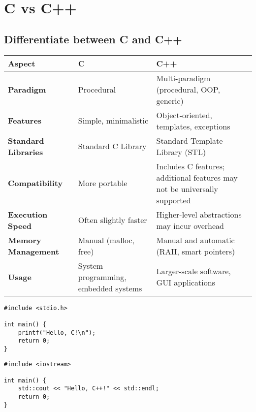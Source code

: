 \section{C vs C++}

\subsection{Differentiate between C and C++}
\begin{tabularx}{\textwidth}{|p{3.5cm}|X|X|}
    \hline \rowcolor{tableheader}
    \textbf{Aspect}                    & \textbf{C}                           & \textbf{C++} \\
    \hline \textbf{Paradigm}           & Procedural                           & Multi-paradigm (procedural, OOP, generic) \\
    \hline \textbf{Features}           & Simple, minimalistic                 & Object-oriented, templates, exceptions \\
    \hline \textbf{Standard Libraries} & Standard C Library                   & Standard Template Library (STL) \\
    \hline \textbf{Compatibility}      & More portable                        & Includes C features; additional features may not be universally supported \\
    \hline \textbf{Execution Speed}    & Often slightly faster                & Higher-level abstractions may incur overhead \\
    \hline \textbf{Memory Management}  & Manual (malloc, free)                & Manual and automatic (RAII, smart pointers) \\
    \hline \textbf{Usage}              & System programming, embedded systems & Larger-scale software, GUI applications \\
    \hline
\end{tabularx}

\begin{tcolorbox}[title=C]
\begin{verbatim}
#include <stdio.h>

int main() {
    printf("Hello, C!\n");
    return 0;
}
\end{verbatim}
\end{tcolorbox}

\begin{tcolorbox}[title=C++]
\begin{verbatim}
#include <iostream>

int main() {
    std::cout << "Hello, C++!" << std::endl;
    return 0;
}
\end{verbatim}
\end{tcolorbox}


